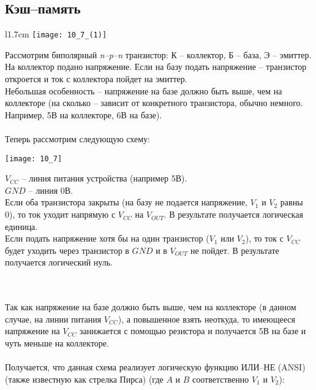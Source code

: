 \subsection{Кэш--память}
\begin{wrapfigure}[7]{l}{1.7cm}
\texttt{[image: 10\_7\_(1)]}
\end{wrapfigure}
Рассмотрим биполярный \emph{n--p--n} транзистор: К -- коллектор, Б -- база, Э -- эмиттер. На коллектор подано напряжение. Если на базу подать напряжение -- транзистор откроется и ток с коллектора пойдет на эмиттер.
\\Небольшая особенность -- напряжение на базе должно быть выше, чем на коллекторе (на сколько -- зависит от конкретного транзистора, обычно немного. Например, 5В на коллекторе, 6В на базе).
\\
\\Теперь рассмотрим следующую схему:
\\
\begin{minipage}[l]{5cm}
\texttt{[image: 10\_7]}
\end{minipage}
\begin{minipage}[l]{7cm}
$V_{CC}$ -- линия питания устройства (например 5В).
\\$GND$ -- линия 0В.
\\Если оба транзистора закрыты (на базу не подается напряжение, $V_1$ и $V_2$ равны 0), то ток уходит напрямую с $V_{CC}$ на $V_{OUT}$. В результате получается логическая единица.
\\Если подать напряжение хотя бы на один транзистор ($V_1$ или $V_2$), то ток с $V_{CC}$ будет уходить через транзистор в $GND$ и в $V_{OUT}$ не пойдет. В результате получается логический нуль.
\end{minipage}
\\
\\Так как напряжение на базе должно быть выше, чем на коллекторе (в данном случае, на линии питания $V_{CC}$), а повышенное взять неоткуда, то имеющееся напряжение на $V_{CC}$ занижается с помощью резистора и получается 5В на базе и чуть меньше на коллекторе.
\\
\\Получается, что данная схема реализует логическую функцию ИЛИ--НЕ (ANSI) (также известную как стрелка Пирса) (где $A$ и $B$ соответственно $V_1$ и $V_2$):


